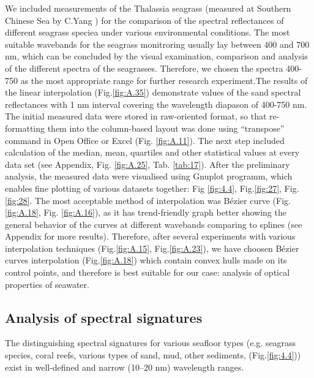 \documentclass[10pt, a4paper]{article}
\begin{document}
We included measurements of the Thalassia seagrass
(measured at Southern Chinese Sea by C.Yang \cite{Yang10} \label{Yang10}) for the comparison of the spectral reflectances of
different seagrass speciea under various environmental conditions.
The most suitable wavebands for the seagrass monitroring usually lay between 400 and 700 nm,
which can be concluded by the visual examination, comparison and analysis of the different spectra of
the seagrasses. Therefore, we chosen the spectra 400-750 as the most appropriate range for
further research experiment.The results of the linear interpolation (Fig.\ref{fig:A.35}) demonstrate values of the
sand spectral reflectances with 1 nm interval covering the wavelength diapason of 400-750 nm.\\
The initial measured data were stored in raw-oriented format, so that re-formatting them into the
column-based layout was done using “transpose” command in Open Office or Excel (Fig. \ref{fig:A.11}). The next step included
calculation of the median, mean, quartiles and other statistical values at every data set (see Appendix, Fig. \ref{fig:A.25}, Tab. \ref{tab:17}).
After the preliminary analysis, the measured data were visualised using Gnuplot programm, which
enables fine plotting of various datasets together: Fig \ref{fig:4.4}, Fig.\ref{fig:27}, Fig.\ref{fig:28}. The most acceptable method of interpolation was B\'ezier curve (Fig. \ref{fig:A.18}, Fig. \ref{fig:A.16}),
as it has trend-friendly graph better showing the general behavior of the curves at different wavebands
comparing to splines (see Appendix for more results). 
Therefore, after several experiments with
various interpolation techniques (Fig.\ref{fig:A.15}, Fig.\ref{fig:A.23}), we have choosen B\'ezier curves interpolation (Fig.\ref{fig:A.18}) which contain convex
hulls made on its control points, and therefore is best suitable for our case: analysis of optical
properties of seawater.
%
\subsection{Analysis of spectral signatures}
The distinguishing spectral signatures for various seafloor types (e.g. seagrass species, coral reefs,
various types of sand, mud, other sediments, (Fig.\ref{fig:4.4})) exist in well-defined and narrow (10–20 nm)
wavelength ranges. 
\end{document}
